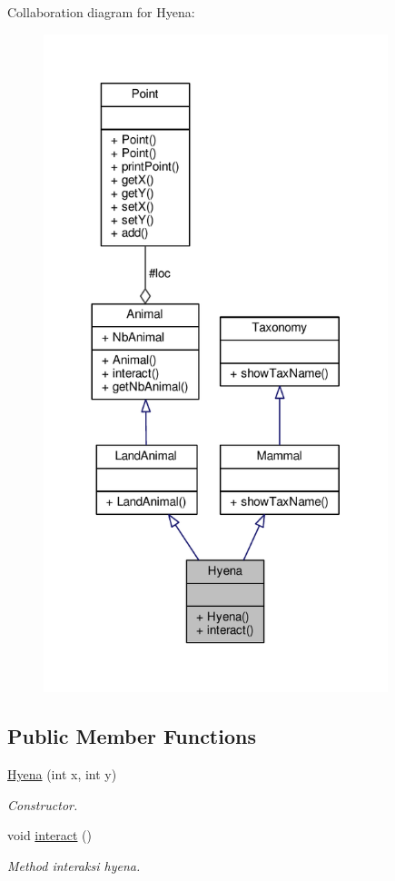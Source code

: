 Collaboration diagram for Hyena\+:
\nopagebreak
\begin{figure}[H]
\begin{center}
\leavevmode
\includegraphics[width=284pt]{classHyena__coll__graph}
\end{center}
\end{figure}
\subsection*{Public Member Functions}
\begin{DoxyCompactItemize}
\item 
\hyperlink{classHyena_a49a9c409606187720e4fbde4b248f1e6}{Hyena} (int x, int y)
\begin{DoxyCompactList}\small\item\em Constructor. \end{DoxyCompactList}\item 
void \hyperlink{classHyena_aaac9f93962c49ea129626bc7719bcbe7}{interact} ()\hypertarget{classHyena_aaac9f93962c49ea129626bc7719bcbe7}{}\label{classHyena_aaac9f93962c49ea129626bc7719bcbe7}

\begin{DoxyCompactList}\small\item\em Method interaksi hyena. \end{DoxyCompactList}\end{DoxyCompactItemize}
